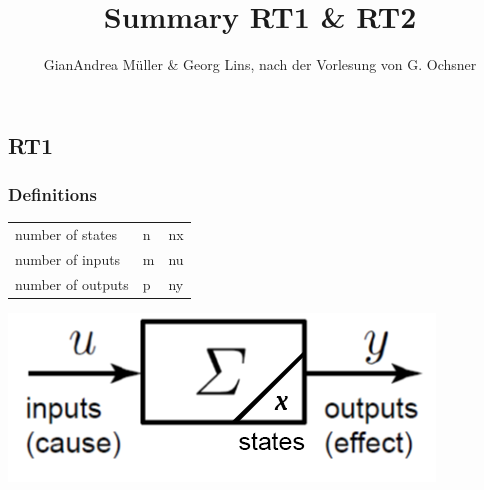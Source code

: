 \documentclass[10pt,a4paper]{scrartcl}
\author{GianAndrea Müller \& Georg Lins, nach der Vorlesung von G. Ochsner}
\title{Summary RT1 \& RT2\vspace{-1ex}}
\begin{document}
\maketitle
\begin{multicols*}{4}
\footnotesize
\tableofcontents
\normalsize
\end{multicols*}

\begin{multicols*}{3}	%
	\parindent 0pt %
	\setlength{\columnseprule}{0.5pt}	%
	\part{RT1}
	\section{Definitions}
	
	\setlength{\columnseprule}{0pt}
	\small
	\begin{multicols*}{2}
	\begin{tabular}{ll@{=}l}
	number of states&n&nx\\
	number of inputs&m&nu\\
	number of outputs&p&ny\\
	\end{tabular}
	\normalsize
	\includegraphics[width=\linewidth]{Signal1}
	\end{multicols*}
	\setlength{\columnseprule}{0.5pt}	
	

\end{multicols*}
\end{document}
